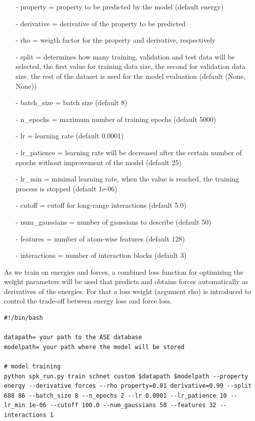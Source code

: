 \begin{enumerate}
    \item[-] property = property to be predicted by the model (default energy)
    \item[-] derivative = derivative of the property to be predicted
    \item[-] rho = weigth factor for the property and derivative, respectively
    \item[-] split = determines how many training, validation and test data will be selected, the first value for training data size, the second for validation data size, the rest of the dataset is used for the model evaluation (default (None, None))
    \item[-] batch\_size = batch size (default 8)
    \item[-] n\_epochs = maximum number of training epochs (default 5000)
    \item[-] lr = learning rate (default 0.0001)
    \item[-] lr\_patience = learning rate will be decreased after the certain number of epochs without improvement of the model (default 25)
    \item[-] lr\_min = minimal learning rate, when the value is reached, the training process is stopped (default 1e-06)
    \item[-] cutoff = cutoff for long-range interactions (default 5.0)
    \item[-] num\_gaussians = number of gaussians to describe (default 50)
    \item[-] features = number of atom-wise features (default 128)
    \item[-] interactions = number of interaction blocks (default 3)
\end{enumerate}

As we train on energies and forces, a combined loss function for optimizing the weight parameters will be used that predicts and obtains forces automatically as derivatives of the energies. For that a loss weight (argument rho) is introduced to control the trade-off between energy loss and force loss.

\begin{lstlisting}[breaklines=true, breakatwhitespace=false]
#!/bin/bash

datapath= your path to the ASE database
modelpath= your path where the model will be stored

# model training
python spk_run.py train schnet custom $datapath $modelpath --property energy --derivative forces --rho property=0.01 derivative=0.99 --split 688 86 --batch_size 8 --n_epochs 2 --lr 0.0001 --lr_patience 10 --lr_min 1e-06 --cutoff 100.0 --num_gaussians 50 --features 32 --interactions 1
\end{lstlisting}

